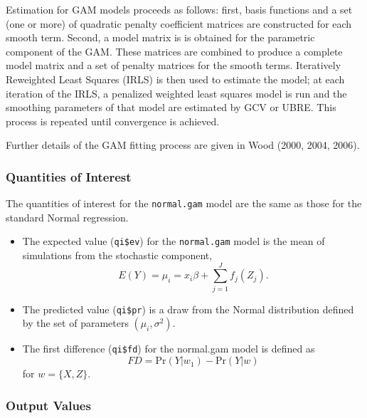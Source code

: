 Estimation for GAM models proceeds as follows: first, basis functions and a set (one or more) of quadratic penalty coefficient matrices are constructed for each smooth term. Second, a model matrix is is obtained for the parametric component of the GAM. These matrices are combined to produce a complete model matrix and a set of penalty matrices for the smooth terms. Iteratively Reweighted Least Squares (IRLS) is then used to estimate the model; at each iteration of the IRLS, a penalized weighted least squares model is run and the smoothing parameters of that model are estimated by GCV or UBRE. This process is repeated until convergence is achieved. 

Further details of the GAM fitting process are given in Wood (2000, 2004, 2006). 




\subsubsection{Quantities of Interest}
The quantities of interest for the {\tt normal.gam} model are the same as those for the standard Normal regression. 
\begin{itemize}
\item The expected value ({\tt qi\$ev}) for the {\tt normal.gam} model is the mean of simulations from the stochastic component,  
\begin{equation*}
E(Y) = \mu_{i} =  x_{i}\beta + \sum_{j=1}^{J} f_j (Z_j).
\end{equation*}
\item The predicted value ({\tt qi\$pr}) is a draw from the Normal distribution defined by the set of parameters $(\mu_i, \sigma^2)$.
\item The first difference ({\tt qi\$fd}) for the normal.gam model is defined as 
\begin{equation*}
FD = \text{Pr}(Y| w_{1}) - \text{Pr}(Y| w)
\end{equation*}
for $w=\{X, Z\}$.
\end{itemize}



\subsubsection{Output Values}



